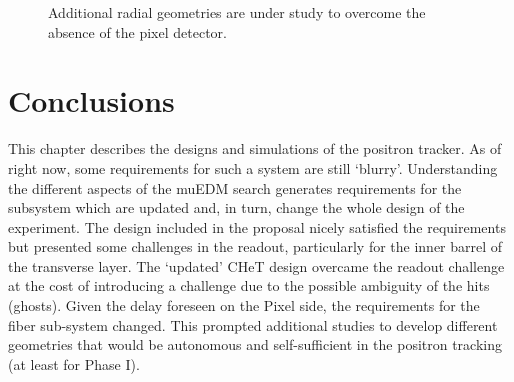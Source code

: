 \begin{refsection}
        \begin{figure}
            \centering
        \caption[Additional radial geometries for the tracker]{Additional radial geometries are under study to overcome the absence of the pixel detector.} 
        \end{figure}
\section{Conclusions}
    This chapter describes the designs and simulations of the positron tracker.
    As of right now, some requirements for such a system are still `blurry'.
    Understanding the different aspects of the muEDM search generates requirements for the subsystem which are updated and, in turn, change the whole design of the experiment.
    The design included in the proposal nicely satisfied the requirements but presented some challenges in the readout, particularly for the inner barrel of the transverse layer.
    The `updated' CHeT design overcame the readout challenge at the cost of introducing a challenge due to the possible ambiguity of the hits (ghosts).
    Given the delay foreseen on the Pixel side, the requirements for the fiber sub-system changed.
    This prompted additional studies to develop different geometries that would be autonomous and self-sufficient in the positron tracking (at least for Phase I).
    
\printbibliography[
    heading = bibliographychapter,
    title=Bibliography on muEDM positron tracker
]

\end{refsection}